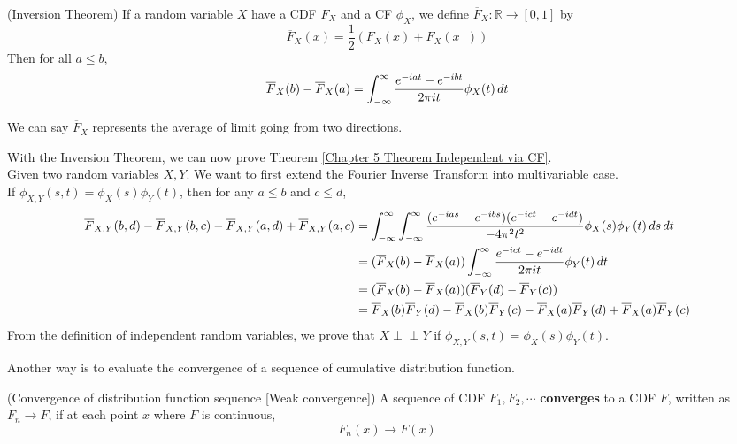 \documentclass{huhtakm-template-book}
\newcommand{\independent}{\perp\!\!\!\perp}
\begin{document}
\begin{thm}(Inversion Theorem)
    If a random variable $X$ have a CDF $F_{X}$ and a CF $\phi_{X}$, we define $\overline{F}_{X}:\mathbb{R}\to[0,1]$ by
    \begin{equation*}
        \overline{F}_{X}(x)=\frac{1}{2}\left(F_{X}(x)+F_{X}(x^{-})\right)
    \end{equation*}
    Then for all $a\leq b$,
    \begin{equation*}
        \overline{F}_{X}(b)-\overline{F}_{X}(a)=\int_{-\infty}^{\infty}\frac{e^{-iat}-e^{-ibt}}{2\pi it}\phi_{X}(t)\,dt
    \end{equation*}
\end{thm}
\begin{rem}
    We can say $\overline{F}_{X}$ represents the average of limit going from two directions.
\end{rem}
\begin{eg}
    \label{Chapter 5 Example Proof of Theorem 5.27}
    With the Inversion Theorem, we can now prove Theorem \ref{Chapter 5 Theorem Independent via CF}.\\
    Given two random variables $X,Y$. We want to first extend the Fourier Inverse Transform into multivariable case.\\
    If $\phi_{X,Y}(s,t)=\phi_{X}(s)\phi_{Y}(t)$, then for any $a\leq b$ and $c\leq d$,
    \begin{align*}
        \overline{F}_{X,Y}(b,d)-\overline{F}_{X,Y}(b,c)-\overline{F}_{X,Y}(a,d)+\overline{F}_{X,Y}(a,c)&=\int_{-\infty}^{\infty}\int_{-\infty}^{\infty}\frac{(e^{-ias}-e^{-ibs})(e^{-ict}-e^{-idt})}{-4\pi^{2}t^{2}}\phi_{X}(s)\phi_{Y}(t)\,ds\,dt\\
        &=(\overline{F}_{X}(b)-\overline{F}_{X}(a))\int_{-\infty}^{\infty}\frac{e^{-ict}-e^{-idt}}{2\pi it}\phi_{Y}(t)\,dt\\
        &=(\overline{F}_{X}(b)-\overline{F}_{X}(a))(\overline{F}_{Y}(d)-\overline{F}_{Y}(c))\\
        &=\overline{F}_{X}(b)\overline{F}_{Y}(d)-\overline{F}_{X}(b)\overline{F}_{Y}(c)-\overline{F}_{X}(a)\overline{F}_{Y}(d)+\overline{F}_{X}(a)\overline{F}_{Y}(c)
    \end{align*}
    From the definition of independent random variables, we prove that $X\independent Y$ if $\phi_{X,Y}(s,t)=\phi_{X}(s)\phi_{Y}(t)$.
\end{eg}
\newpage
Another way is to evaluate the convergence of a sequence of cumulative distribution function.
\begin{defn}(Convergence of distribution function sequence [Weak convergence])
    A sequence of CDF 
    $F_{1},F_{2},\cdots$ \textbf{converges} to a CDF $F$, written as $F_{n}\to F$, if at each point $x$ where $F$ is continuous,
    \begin{equation*}
        F_{n}(x)\to F(x)
    \end{equation*}
\end{defn}
\end{document}
